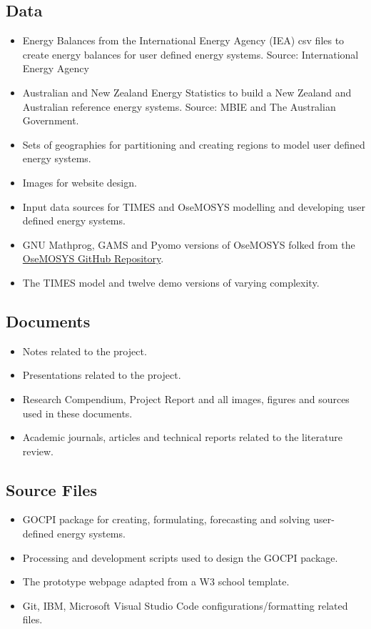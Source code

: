 \documentclass[12pt]{article}
\begin{document}
\subsection{Data}
\begin{itemize}
	\item Energy Balances from the International Energy Agency (IEA) csv files to create energy balances for user defined energy systems. Source: International Energy Agency
	\item Australian and New Zealand Energy Statistics to build a New Zealand and Australian reference energy systems. Source: MBIE and The Australian Government.
	\item Sets of geographies for partitioning and creating regions to model user defined energy systems.
	\item Images for website design.
	\item Input data sources for TIMES and OseMOSYS modelling and developing user defined energy systems.
	\item GNU Mathprog, GAMS and Pyomo versions of OseMOSYS folked from the \href{https://github.com/OSeMOSYS/OSeMOSYS}{OseMOSYS GitHub Repository}.
	\item The TIMES model and twelve demo versions of varying complexity.
\end{itemize}
\subsection{Documents}
\begin{itemize}
	\item Notes related to the project.
	\item Presentations related to the project.
	\item Research Compendium, Project Report and all images, figures and sources used in these documents.
	\item Academic journals, articles and technical reports related to the literature review.
\end{itemize}
\subsection{Source Files}
\begin{itemize}
	\item GOCPI package for creating, formulating, forecasting and solving user-defined energy systems.
	\item Processing and development scripts used to design the GOCPI package.
	\item The prototype webpage adapted from a W3 school template.
	\item Git, IBM, Microsoft Visual Studio Code configurations/formatting related files.
\end{itemize}
\end{document}
